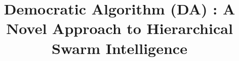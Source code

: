 \documentclass[conference]{IEEEtran}
\begin{document}
\title{Democratic Algorithm (DA) : A Novel Approach to Hierarchical Swarm Intelligence\\
}


\maketitle
\end{document}
